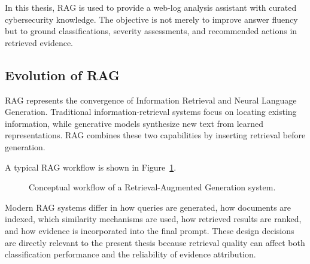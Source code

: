 In this thesis, RAG is used to provide a web-log analysis assistant with
curated cybersecurity knowledge. The objective is not merely to improve
answer fluency but to ground classifications, severity assessments, and
recommended actions in retrieved evidence.

\subsection{Evolution of RAG}\label{evolution-of-rag}

RAG represents the convergence of Information Retrieval and Neural
Language Generation. Traditional information-retrieval systems focus on
locating existing information, while generative models synthesize new
text from learned representations. RAG combines these two capabilities
by inserting retrieval before generation.

A typical RAG workflow is shown in Figure~\ref{fig:conceptual-rag-workflow}.

\begin{figure}[H]
    \centering
    \caption{Conceptual workflow of a Retrieval-Augmented Generation system.}
    \label{fig:conceptual-rag-workflow}
\end{figure}

Modern RAG systems differ in how queries are generated, how documents
are indexed, which similarity mechanisms are used, how retrieved results
are ranked, and how evidence is incorporated into the final prompt.
These design decisions are directly relevant to the present thesis
because retrieval quality can affect both classification performance and
the reliability of evidence attribution.


